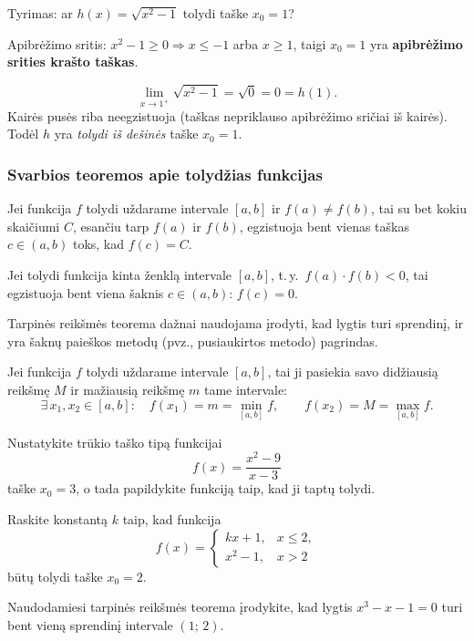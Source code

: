 \begin{example}
Tyrimas: ar $h(x)=\sqrt{x^2-1}$ tolydi taške $x_0=1$?

Apibrėžimo sritis: $x^2-1\geq0 \Rightarrow x\leq-1$ arba $x\geq1$,
taigi $x_0=1$ yra \textbf{apibrėžimo srities krašto taškas}.

\[
  \lim_{x\to 1^+}\sqrt{x^2-1}=\sqrt{0}=0=h(1).
\]
Kairės pusės riba neegzistuoja (taškas nepriklauso apibrėžimo sričiai iš
kairės). Todėl $h$ yra \textit{tolydi iš dešinės} taške $x_0=1$.
\end{example}

\subsubsection*{Svarbios teoremos apie tolydžias funkcijas}

\begin{theorem}
Jei funkcija $f$ tolydi uždarame intervale $[a,b]$ ir $f(a)\neq f(b)$,
tai su bet kokiu skaičiumi $C$, esančiu tarp $f(a)$ ir $f(b)$, egzistuoja
bent vienas taškas $c\in(a,b)$ toks, kad $f(c)=C$.
\end{theorem}

\begin{corollary}
Jei tolydi funkcija kinta ženklą intervale $[a,b]$, t.\,y.\
$f(a)\cdot f(b)<0$, tai egzistuoja bent viena šaknis $c\in(a,b)$:
$f(c)=0$.
\end{corollary}

\begin{remark}
Tarpinės reikšmės teorema dažnai naudojama įrodyti, kad lygtis turi
sprendinį, ir yra šaknų paieškos metodų (pvz., pusiaukirtos metodo)
pagrindas.
\end{remark}

\begin{theorem}
Jei funkcija $f$ tolydi uždarame intervale $[a,b]$, tai ji pasiekia savo
didžiausią reikšmę $M$ ir mažiausią reikšmę $m$ tame intervale:
\[
    \exists\, x_1,x_2\in[a,b]:\quad
    f(x_1)=m=\min_{[a,b]}f,\qquad
    f(x_2)=M=\max_{[a,b]}f.
\]
\end{theorem}

\begin{exercise}
Nustatykite trūkio taško tipą funkcijai
\[
  f(x)=\frac{x^2-9}{x-3}
\]
taške $x_0=3$, o tada papildykite funkciją taip, kad ji taptų tolydi.
\end{exercise}

\begin{exercise}
Raskite konstantą $k$ taip, kad funkcija
\[
  f(x)=
  \begin{cases}
    kx+1, & x\leq 2,\\
    x^2-1,& x>2
  \end{cases}
\]
būtų tolydi taške $x_0=2$.
\end{exercise}

\begin{exercise}
Naudodamiesi tarpinės reikšmės teorema įrodykite, kad lygtis
$x^3-x-1=0$ turi bent vieną sprendinį intervale $(1;\,2)$.
\end{exercise}

